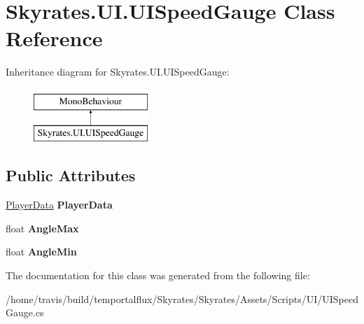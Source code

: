\hypertarget{class_skyrates_1_1_u_i_1_1_u_i_speed_gauge}{\section{Skyrates.\-U\-I.\-U\-I\-Speed\-Gauge Class Reference}
\label{class_skyrates_1_1_u_i_1_1_u_i_speed_gauge}
}
Inheritance diagram for Skyrates.\-U\-I.\-U\-I\-Speed\-Gauge\-:\begin{figure}[H]
\begin{center}
\leavevmode
\includegraphics[height=2.000000cm]{class_skyrates_1_1_u_i_1_1_u_i_speed_gauge}
\end{center}
\end{figure}
\subsection*{Public Attributes}
\begin{DoxyCompactItemize}
\item 
\hypertarget{class_skyrates_1_1_u_i_1_1_u_i_speed_gauge_ab1fec71c6c96d165951f51af222be8b9}{\hyperlink{class_skyrates_1_1_data_1_1_player_data}{Player\-Data} {\bfseries Player\-Data}}\label{class_skyrates_1_1_u_i_1_1_u_i_speed_gauge_ab1fec71c6c96d165951f51af222be8b9}

\item 
\hypertarget{class_skyrates_1_1_u_i_1_1_u_i_speed_gauge_a9315560768a6804ab6b15fd11ad6b0be}{float {\bfseries Angle\-Max}}\label{class_skyrates_1_1_u_i_1_1_u_i_speed_gauge_a9315560768a6804ab6b15fd11ad6b0be}

\item 
\hypertarget{class_skyrates_1_1_u_i_1_1_u_i_speed_gauge_aaa4cd647d67be1aa788fb3e6b1783d8d}{float {\bfseries Angle\-Min}}\label{class_skyrates_1_1_u_i_1_1_u_i_speed_gauge_aaa4cd647d67be1aa788fb3e6b1783d8d}

\end{DoxyCompactItemize}


The documentation for this class was generated from the following file\-:\begin{DoxyCompactItemize}
\item 
/home/travis/build/temportalflux/\-Skyrates/\-Skyrates/\-Assets/\-Scripts/\-U\-I/U\-I\-Speed\-Gauge.\-cs\end{DoxyCompactItemize}
